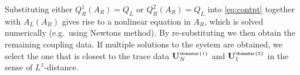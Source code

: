 \documentclass[a4paper,11pt]{article}
\newcommand{\rmn}[1]{\text{\tiny \Romanbar{#1}}}
\begin{document}
Substituting either $Q^1_R(A_R)=Q_L$ or $Q^2_R(A_R)=Q_L$ into \eqref{eq:contpt} together with $A_L(A_R)$ gives rise to a nonlinear equation in $A_R$, which is solved numerically (e.g.\ using Newtons method). By re-substituting we then obtain the remaining coupling data. If multiple solutions to the system are obtained, we select the one that is closest to the trace data $\mathbf U_N^{\rmn{1}}$ and $\mathbf U_1^{\rmn{2}}$ in the sense of $L^1$-distance.
\end{document}
